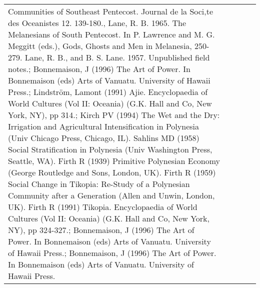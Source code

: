 \begin{longtable}{p{2cm}p{2cm}p{2cm}p{5cm}p{7cm}}
Communities of Southeast Pentecost. Journal de la Soci‚te des Oceanistes 12. 139-180., Lane, R. B. 1965. The Melanesians of South Pentecost. In P. Lawrence and M. G. Meggitt (eds.), Gods, Ghosts and Men in Melanesia, 250-279. Lane, R. B., and B. S. Lane. 1957. Unpublished field notes.; Bonnemaison, J (1996) The Art of Power. In Bonnemaison (eds) Arts of Vanuatu. University of Hawaii Press.; Lindström, Lamont (1991) Ajie. Encyclopaedia of World Cultures (Vol II: Oceania) (G.K. Hall and Co, New York, NY), pp 314.; Kirch PV (1994) The Wet and the Dry: Irrigation and Agricultural Intensification in Polynesia (Univ Chicago Press, Chicago, IL). Sahlins MD (1958) Social Stratification in Polynesia (Univ Washington Press, Seattle, WA). Firth R (1939) Primitive Polynesian Economy (George Routledge and Sons, London, UK). Firth R (1959) Social Change in Tikopia: Re-Study of a Polynesian Community after a Generation (Allen and Unwin, London, UK). Firth R (1991) Tikopia. Encyclopaedia of World Cultures (Vol II: Oceania) (G.K. Hall and Co, New York, NY), pp 324-327.; Bonnemaison, J (1996) The Art of Power. In Bonnemaison (eds) Arts of Vanuatu. University of Hawaii Press.; Bonnemaison, J (1996) The Art of Power. In Bonnemaison (eds) Arts of Vanuatu. University of Hawaii Press. \\ 

\end{longtable}
